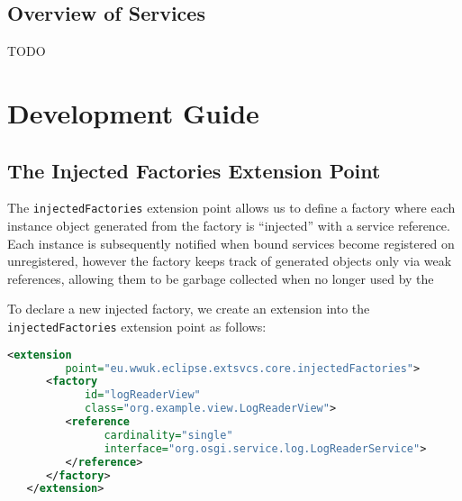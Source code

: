 \documentclass[12pt]{article}
\begin{document}
\subsection{Overview of Services}

TODO

\section{Development Guide}

\subsection{The Injected Factories Extension Point}

The \texttt{injectedFactories} extension point allows us to define a factory where each instance object generated from the factory is ``injected'' with a service reference. Each instance is subsequently notified when bound services become registered on unregistered, however the factory keeps track of generated objects only via weak references, allowing them to be garbage collected when no longer used by the 

To declare a new injected factory, we create an extension into the \texttt{injected\-Fac\-tories} extension point as follows:

\begin{lstlisting}[language=xml]
   <extension
         point="eu.wwuk.eclipse.extsvcs.core.injectedFactories">
      <factory
            id="logReaderView"
            class="org.example.view.LogReaderView">
         <reference
               cardinality="single"
               interface="org.osgi.service.log.LogReaderService">
         </reference>
      </factory>
   </extension>
\end{lstlisting}
\end{document}
